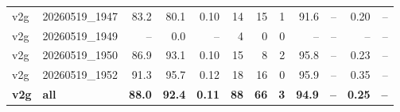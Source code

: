 \begin{table}[t]
\begin{tabular}{llrrrrrrrrrr}
v2g & 20260519\_1947 & 83.2 & 80.1 & 0.10 & 14 & 15 & 1 & 91.6 & -- & 0.20 & -- \\
v2g & 20260519\_1949 & -- & 0.0 & -- & 4 & 0 & 0 & -- & -- & -- & -- \\
v2g & 20260519\_1950 & 86.9 & 93.1 & 0.10 & 15 & 8 & 2 & 95.8 & -- & 0.23 & -- \\
v2g & 20260519\_1952 & 91.3 & 95.7 & 0.12 & 18 & 16 & 0 & 95.9 & -- & 0.35 & -- \\
\textbf{v2g} & \textbf{all} & \textbf{88.0} & \textbf{92.4} & \textbf{0.11} & \textbf{88} & \textbf{66} & \textbf{3} & \textbf{94.9} & \textbf{--} & \textbf{0.25} & \textbf{--} \\
\bottomrule
\end{tabular}
\end{table}
